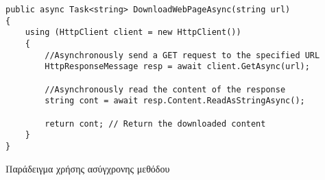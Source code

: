 \begin{listing}[htbp]
\begin{verbatim}
public async Task<string> DownloadWebPageAsync(string url)
{
    using (HttpClient client = new HttpClient())
    {
        //Asynchronously send a GET request to the specified URL
        HttpResponseMessage resp = await client.GetAsync(url);
        
        //Asynchronously read the content of the response
        string cont = await resp.Content.ReadAsStringAsync();
        
        return cont; // Return the downloaded content
    }
}
\end{verbatim}
\caption{Παράδειγμα χρήσης ασύγχρονης μεθόδου}
\label{asyncExample}
\end{listing}